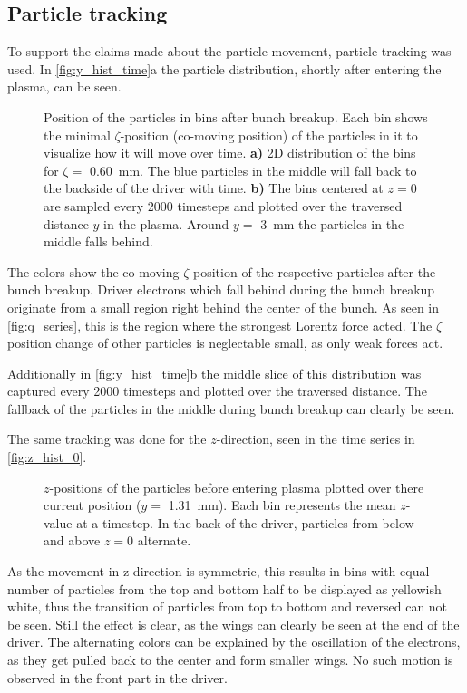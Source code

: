 \documentclass[bachelor_thesis]{subfiles}
\begin{document}
\subsection{Particle tracking}
To support the claims made about the particle movement, particle tracking was used. In \autoref{fig:y_hist_time}a the particle distribution, shortly after entering the plasma, can be seen.
\begin{figure}
	\centering
	
	\caption{Position of the particles in bins after bunch breakup. Each bin shows the minimal $\zeta$-position (co-moving position) of the particles in it to visualize how it will move over time.
	\textbf{a)} 2D distribution of the bins for $\zeta=$ \qty{0.60}{\mm}. The blue particles in the middle will fall back to the backside of the driver with time.
	\textbf{b)} The bins centered at $z=0$ are sampled every 2000 timesteps and plotted over the traversed distance $y$ in the plasma. Around $y=$ \qty{3}{mm} the particles in the middle falls behind.}
	\label{fig:y_hist_time}
\end{figure}
The colors show the co-moving $\zeta$-position of the respective particles after the bunch breakup. Driver electrons which fall behind during the bunch breakup originate from a small region right behind the center of the bunch. 
As seen in \autoref{fig:q_series}, this is the region where the strongest Lorentz force acted.
The $\zeta$ position change of other particles is neglectable small, as only weak forces act.

Additionally in \autoref{fig:y_hist_time}b the middle slice of this distribution was captured every 2000 timesteps and plotted over the traversed distance. The fallback of the particles in the middle during bunch breakup can clearly be seen.

The same tracking was done for the $z$-direction, seen in the time series in \autoref{fig:z_hist_0}.
\begin{figure}
	\centering
	
	\caption{$z$-positions of the particles before entering plasma plotted over there current position ($y=$ \qty{1.31}{mm}). Each bin represents the mean $z$-value at a timestep. In the back of the driver, 
	particles from below and above $z=0$ alternate. }
	\label{fig:z_hist_0}
\end{figure}
As the movement in z-direction is symmetric, this results in bins with equal number of particles from the top and bottom half to be displayed as yellowish white, thus the transition of particles from top to bottom and reversed can not be seen. Still the effect is clear, as the wings can clearly be seen at the end of the driver.
The alternating colors can be explained by the oscillation of the electrons, as they get pulled back to the center and form smaller wings. No such motion is observed in the front part in the driver.
\end{document}
